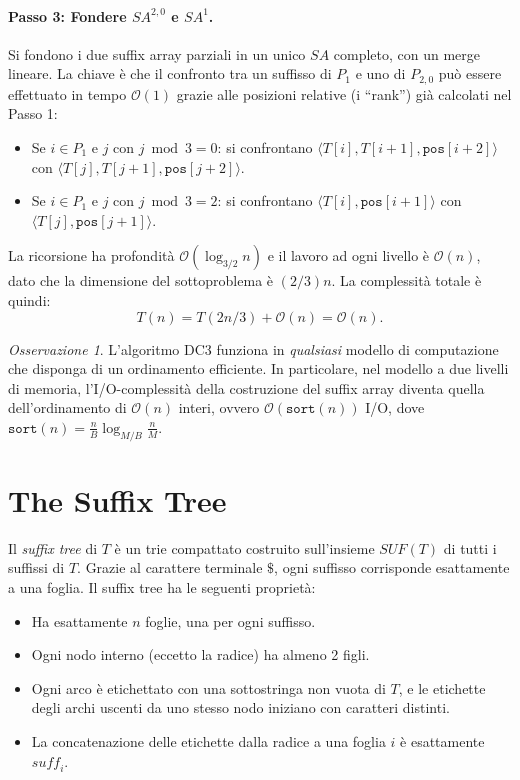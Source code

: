 \documentclass[12pt, a4paper, oneside]{book}
\theoremstyle{plain}
\theoremstyle{definition}
\theoremstyle{remark}
\newtheorem{osservazione}[teorema]{Osservazione}
\newcommand{\OO}[1]{\mathcal{O}\!\left(#1\right)}
\begin{document}
\paragraph{Passo 3: Fondere $SA^{2,0}$ e $SA^1$.}
Si fondono i due suffix array parziali in un unico $SA$ completo, con un merge lineare. La chiave è che il confronto tra un suffisso di $P_1$ e uno di $P_{2,0}$ può essere effettuato in tempo $\OO{1}$ grazie alle posizioni relative (i ``rank'') già calcolati nel Passo 1:
\begin{itemize}
  \item Se $i \in P_1$ e $j$ con $j \bmod 3 = 0$: si confrontano $\langle T[i], T[i+1], \mathtt{pos}[i+2] \rangle$ con $\langle T[j], T[j+1], \mathtt{pos}[j+2] \rangle$.
  \item Se $i \in P_1$ e $j$ con $j \bmod 3 = 2$: si confrontano $\langle T[i], \mathtt{pos}[i+1] \rangle$ con $\langle T[j], \mathtt{pos}[j+1] \rangle$.
\end{itemize}

\noindent La ricorsione ha profondità $\OO{\log_{3/2} n}$ e il lavoro ad ogni livello è $\OO{n}$, dato che la dimensione del sottoproblema è $(2/3)n$. La complessità totale è quindi:
\[
T(n) = T(2n/3) + \OO{n} = \OO{n}.
\]

\begin{osservazione}
L'algoritmo DC3 funziona in \emph{qualsiasi} modello di computazione che disponga di un ordinamento efficiente. In particolare, nel modello a due livelli di memoria, l'I/O-complessità della costruzione del suffix array diventa quella dell'ordinamento di $\OO{n}$ interi, ovvero $\OO{\mathtt{sort}(n)}$ I/O, dove $\mathtt{sort}(n) = \frac{n}{B}\log_{M/B}\frac{n}{M}$.
\end{osservazione}

\section{The Suffix Tree}
\label{sec:suffix-tree}

Il \emph{suffix tree} di $T$ è un trie compattato costruito sull'insieme $\mathit{SUF}(T)$ di tutti i suffissi di $T$. Grazie al carattere terminale $\$$, ogni suffisso corrisponde esattamente a una foglia. Il suffix tree ha le seguenti proprietà:

\begin{itemize}
  \item Ha esattamente $n$ foglie, una per ogni suffisso.
  \item Ogni nodo interno (eccetto la radice) ha almeno 2 figli.
  \item Ogni arco è etichettato con una sottostringa non vuota di $T$, e le etichette degli archi uscenti da uno stesso nodo iniziano con caratteri distinti.
  \item La concatenazione delle etichette dalla radice a una foglia $i$ è esattamente $\mathit{suff}_i$.
\end{itemize}
\end{document}
